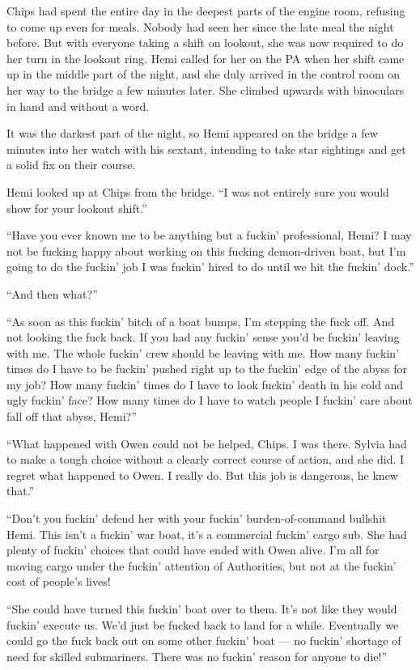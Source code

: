 \documentclass[
]{scrbook}
\begin{document}
Chips had spent the entire day in the deepest parts of the engine room,
refusing to come up even for meals. Nobody had seen her since the late
meal the night before. But with everyone taking a shift on lookout, she
was now required to do her turn in the lookout ring. Hemi called for her
on the PA when her shift came up in the middle part of the night, and
she duly arrived in the control room on her way to the bridge a few
minutes later. She climbed upwards with binoculars in hand and without a
word.

It was the darkest part of the night, so Hemi appeared on the bridge a
few minutes into her watch with his sextant, intending to take star
sightings and get a solid fix on their course.

Hemi looked up at Chips from the bridge. ``I was not entirely sure you
would show for your lookout shift.''

``Have you ever known me to be anything but a fuckin' professional,
Hemi? I may not be fucking happy about working on this fucking
demon-driven boat, but I'm going to do the fuckin' job I was fuckin'
hired to do until we hit the fuckin' dock.''

``And then what?''

``As soon as this fuckin' bitch of a boat bumps, I'm stepping the fuck
off. And not looking the fuck back. If you had any fuckin' sense you'd
be fuckin' leaving with me. The whole fuckin' crew should be leaving
with me. How many fuckin' times do I have to be fuckin' pushed right up
to the fuckin' edge of the abyss for my job? How many fuckin' times do I
have to look fuckin' death in his cold and ugly fuckin' face? How many
times do I have to watch people I fuckin' care about fall off that
abyss, Hemi?''

``What happened with Owen could not be helped, Chips. I was there.
Sylvia had to make a tough choice without a clearly correct course of
action, and she did. I regret what happened to Owen. I really do. But
this job is dangerous, he knew that.''

``Don't you fuckin' defend her with your fuckin' burden-of-command
bullshit Hemi. This isn't a fuckin' war boat, it's a commercial fuckin'
cargo sub. She had plenty of fuckin' choices that could have ended with
Owen alive. I'm all for moving cargo under the fuckin' attention of
Authorities, but not at the fuckin' cost of people's lives!

``She could have turned this fuckin' boat over to them. It's not like
they would fuckin' execute us. We'd just be fucked back to land for a
while. Eventually we could go the fuck back out on some other fuckin'
boat --- no fuckin' shortage of need for skilled submariners. There was
no fuckin' reason for anyone to die!''
\end{document}
